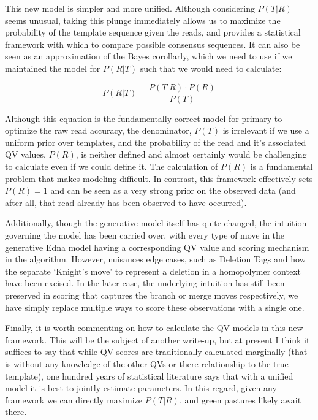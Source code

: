 \documentclass[fleqn,10pt]{SelfArx} %
\begin{document}
This new model is simpler and more unified.  Although considering $P(T|R)$ seems unusual, taking this plunge immediately allows us to maximize the probability of the template sequence given the reads, and provides a statistical framework with which to compare possible consensus sequences.  It can also be seen as an approximation of the Bayes corollarly, which we need to use if we maintained the model for $P(R|T)$ such that we would need to calculate:

\begin{dmath}
P(R|T) = \frac{P(T|R) \cdot P(R)}{P(T)}
\end{dmath}

Although this equation is the fundamentally correct model for primary to optimize the raw read accuracy, the denominator, $P(T)$ is irrelevant if we use a uniform prior over templates, and the probability of the read and it's associated QV values, $P(R)$, is neither defined and almost certainly would be challenging to calculate even if we could define it.  The calculation of $P(R)$ is a fundamental problem that makes modeling difficult.  In contrast, this framework effectively sets $P(R) = 1$ and can be seen as a very strong prior on the observed data (and after all, that read already has been observed to have occurred).  

  Additionally, though the generative model itself has quite changed, the intuition governing the model has been carried over, with every type of move in the generative Edna model having a corresponding QV value and scoring mechanism in the algorithm.  However, nuisances edge cases, such as Deletion Tags and how the separate  `Knight's move' to represent a deletion in a homopolymer context have been excised.   In the later case, the underlying intuition has still been preserved in scoring that captures the branch or merge moves respectively, we have simply replace multiple ways to score these observations with a single one.

Finally, it is worth commenting on how to calculate the QV models in this new framework.  This will be the subject of another write-up, but at present I think it suffices to say that while QV scores are traditionally calculated marginally (that is without any knowledge of the other QVs or there relationship to the true template), one hundred years of statistical literature says that with a unified model it is best to jointly estimate parameters.  In this regard, given any framework we can directly maximize $P(T|R)$, and green pastures likely await there.
\end{document}
